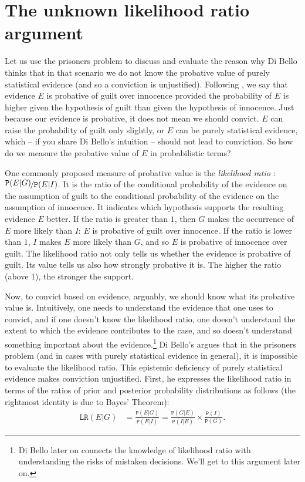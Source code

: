 \documentclass{article}
\newcommand{\pr}[1]{\mbox{$\mathtt{P}(#1)$}}
\newcommand{\lrr}[1]{\mbox{$\mathtt{LR}(#1)$}}
\begin{document}
\section{The unknown likelihood ratio argument}\label{sec:unknownlikelihood}




 Let us   use the prisoners problem to discuss  and evaluate the reason why Di Bello thinks that in that scenario we do not know the probative value of purely statistical evidence (and so a conviction is unjustified).
 Following \citet[5]{dibello2019TrialStatisticsHigh}, we say   that evidence $E$ is probative of guilt over innocence provided the probability of $E$ is higher given the hypothesis of guilt than given the hypothesis of innocence. Just because our evidence is probative, it does not mean we should convict. $E$ can raise the probability of guilt only slightly, or $E$ can be purely statistical evidence, which -- if you share Di Bello's intuition -- should not lead to conviction. So how do we measure the probative value of $E$ in probabilistic terms?

One  commonly proposed  measure of probative value  is the \emph{likelihood ratio} \citep[see eg.][for a discussion]{finkelstein2009basic}: $\nicefrac{\pr{E\vert G}}{\pr{E\vert I}}$. It is the ratio of the conditional probability of the evidence on the assumption of guilt to the conditional probability of the evidence on the assumption of innocence. It  indicates which hypothesis supports the resulting evidence $E$ better. If the ratio is greater than $1$, then $G$ makes the occurrence of $E$ more likely than $I$:   $E$ is probative of guilt over innocence. If the ratio is lower than $1$,  $I$ makes $E$ more likely than $G$, and so  $E$ is probative of innocence over guilt.  The likelihood ratio not only tells us whether the evidence is probative of guilt. Its value tells us also how strongly probative it is. The higher the ratio (above 1), the stronger the support. 

Now, to convict based on evidence, arguably, we should know what its probative value is. Intuitively, one needs to understand the evidence that one uses to convict, and if one doesn't know the likelihood ratio, one doesn't understand the extent to which the evidence contributes to the case, and so doesn't understand something important about the evidence.\footnote{Di Bello later on connects the knowledge of likelihood ratio with understanding the risks of mistaken decisions. We'll get to this argument later on.} Di Bello's argues that in  the prisoners problem (and in cases with purely statistical evidence in general),  it is impossible to evaluate the likelihood ratio. This epistemic deficiency of purely statistical evidence makes conviction unjustified. First,  he expresses the likelihood ratio in terms of the ratios of prior and posterior probability distributions as follows (the rightmost identity is due to Bayes' Theorem):
\begin{align}
\lrr{E\vert G}  & =\frac{\pr{E\vert G}}{\pr{E\vert I}} =  \frac{\pr{G\vert E}}{\pr{I\vert E}}\times \frac{\pr{I}}{\pr{G}}.\label{eq:LRdefined}
\end{align}
\end{document}
